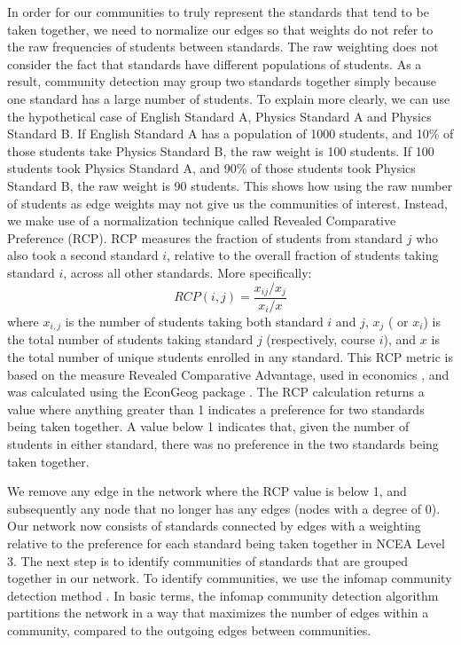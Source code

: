 In order for our communities to truly represent the standards that tend to be taken together, we need to normalize our edges so that weights do not refer to the raw frequencies of students between standards. The raw weighting does not consider the fact that standards have different populations of students. As a result, community detection may group two standards together simply because one standard has a large number of students. To explain more clearly, we can use the hypothetical case of English Standard A, Physics Standard A and Physics Standard B. If English Standard A has a population of 1000 students, and 10\% of those students take Physics Standard B, the raw weight is 100 students. If 100 students took Physics Standard A, and 90\% of those students took Physics Standard B, the raw weight is 90 students. This shows how using the raw number of students as edge weights may not give us the communities of interest. Instead, we make use of a normalization technique called Revealed Comparative Preference (RCP). RCP measures the fraction of students from standard $j$ who also took a second standard $i$, relative to the overall fraction of students taking standard $i$, across all other standards. More specifically: 
$$RCP(i,j) = \frac{x_{ij}/x_j}{x_i/x}$$
where $x_{i,j}$ is the number of students taking both standard $i$ and $j$, $x_j$ ( or $x_i$) is the total number of students taking standard $j$ (respectively, course $i$), and $x$ is the total number of unique students enrolled in any standard. This RCP metric is based on the measure Revealed Comparative Advantage, used in economics \citep{Balassa1965}, and was calculated using the EconGeog package \citep{balland2017economic}. The RCP calculation returns a value where anything greater than 1 indicates a preference for two standards being taken together. A value below 1 indicates that, given the number of students in either standard, there was no preference in the two standards being taken together. 

We remove any edge in the network where the RCP value is below 1, and subsequently any node that no longer has any edges (nodes with a degree of 0). Our network now consists of standards connected by edges with a weighting relative to the preference for each standard being taken together in NCEA Level 3. The next step is to identify communities of standards that are grouped together in our network. To identify communities, we use the infomap community detection method \citep{rosvall2009map}. In basic terms, the infomap community detection algorithm partitions the network in a way that maximizes the number of edges within a community, compared to the outgoing edges between communities. 

